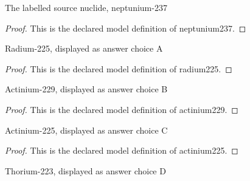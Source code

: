 \begin{definition}[neptunium237]
  \label{def:physics:phyx-mini-0574:phyxminiproblems-problemphyxmini0574-neptunium237}
  The labelled source nuclide, neptunium-237
\end{definition}
\begin{proof}
  This is the declared model definition of neptunium237.
\end{proof}
\begin{definition}[radium225]
  \label{def:physics:phyx-mini-0574:phyxminiproblems-problemphyxmini0574-radium225}
  Radium-225, displayed as answer choice A
\end{definition}
\begin{proof}
  This is the declared model definition of radium225.
\end{proof}
\begin{definition}[actinium229]
  \label{def:physics:phyx-mini-0574:phyxminiproblems-problemphyxmini0574-actinium229}
  Actinium-229, displayed as answer choice B
\end{definition}
\begin{proof}
  This is the declared model definition of actinium229.
\end{proof}
\begin{definition}[actinium225]
  \label{def:physics:phyx-mini-0574:phyxminiproblems-problemphyxmini0574-actinium225}
  Actinium-225, displayed as answer choice C
\end{definition}
\begin{proof}
  This is the declared model definition of actinium225.
\end{proof}
\begin{definition}[thorium223]
  \label{def:physics:phyx-mini-0574:phyxminiproblems-problemphyxmini0574-thorium223}
  Thorium-223, displayed as answer choice D
\end{definition}
